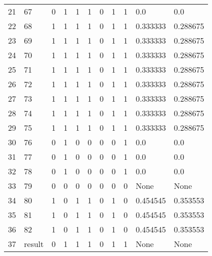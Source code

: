 \begin{tabular}{lllllllllll}
21 &      67 &  0 &  1 &  1 &  1 &  0 &  1 &  1 &        0.0 &       0.0 \\
22 &      68 &  1 &  1 &  1 &  1 &  0 &  1 &  1 &   0.333333 &  0.288675 \\
23 &      69 &  1 &  1 &  1 &  1 &  0 &  1 &  1 &   0.333333 &  0.288675 \\
24 &      70 &  1 &  1 &  1 &  1 &  0 &  1 &  1 &   0.333333 &  0.288675 \\
25 &      71 &  1 &  1 &  1 &  1 &  0 &  1 &  1 &   0.333333 &  0.288675 \\
26 &      72 &  1 &  1 &  1 &  1 &  0 &  1 &  1 &   0.333333 &  0.288675 \\
27 &      73 &  1 &  1 &  1 &  1 &  0 &  1 &  1 &   0.333333 &  0.288675 \\
28 &      74 &  1 &  1 &  1 &  1 &  0 &  1 &  1 &   0.333333 &  0.288675 \\
29 &      75 &  1 &  1 &  1 &  1 &  0 &  1 &  1 &   0.333333 &  0.288675 \\
30 &      76 &  0 &  1 &  0 &  0 &  0 &  0 &  1 &        0.0 &       0.0 \\
31 &      77 &  0 &  1 &  0 &  0 &  0 &  0 &  1 &        0.0 &       0.0 \\
32 &      78 &  0 &  1 &  0 &  0 &  0 &  0 &  1 &        0.0 &       0.0 \\
33 &      79 &  0 &  0 &  0 &  0 &  0 &  0 &  0 &       None &      None \\
34 &      80 &  1 &  0 &  1 &  1 &  0 &  1 &  0 &   0.454545 &  0.353553 \\
35 &      81 &  1 &  0 &  1 &  1 &  0 &  1 &  0 &   0.454545 &  0.353553 \\
36 &      82 &  1 &  0 &  1 &  1 &  0 &  1 &  0 &   0.454545 &  0.353553 \\
37 &  result &  0 &  1 &  1 &  1 &  0 &  1 &  1 &       None &      None \\
\bottomrule
\end{tabular}
